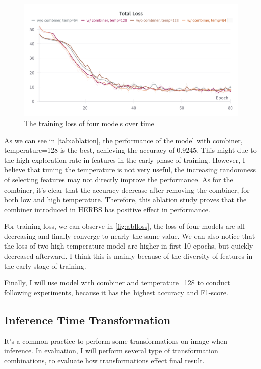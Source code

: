 \documentclass[twocolumn]{extarticle}
\begin{document}
\begin{figure}[H]
\centering
\includegraphics[width=0.95\linewidth]{figure/loss}
\caption{The training loss of four models over time}
\label{fig:ablloss}
\end{figure}


As we can see in \autoref{tab:ablation}, the performance of the model with combiner, temperature=128 is the best, achieving the accuracy of $0.9245$. This might due to the high exploration rate in features in the early phase of training. However, I believe that tuning the temperature is not very useful, the increasing randomness of selecting features may not directly improve the performance. As for the combiner, it's clear that the accuracy decrease after removing the combiner, for both low and high temperature. Therefore, this ablation study proves that the combiner introduced in HERBS has positive effect in performance.

For training loss, we can observe in \autoref{fig:ablloss}, the loss of four models are all decreasing and finally converge to nearly the same value. We can also notice that the loss of two high temperature model are higher in first 10 epochs, but quickly decreased afterward. I think this is mainly because of the diversity of features in the early stage of training.

Finally, I will use model with combiner and temperature=128 to conduct following experiments, because it has the highest accuracy and F1-score.

\subsection{Inference Time Transformation}

It's a common practice to perform some transformations on image when inference. In evaluation, I will perform several type of transformation combinations, to evaluate how transformations effect final result.
\end{document}
